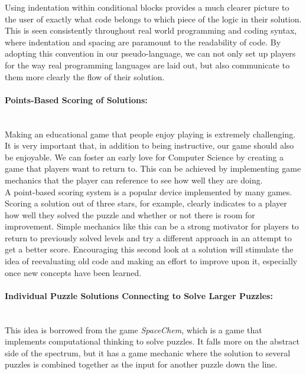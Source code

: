 Using indentation within conditional blocks provides a much clearer picture to the user of exactly what code belongs
to which piece of the logic in their solution. This is seen consistently throughout real world programming and coding
syntax, where indentation and spacing are paramount to the readability of code. By adopting this convention
in our pseudo-language, we can not only set up players for the way real programming languages are laid out, but
also communicate to them more clearly the flow of their solution.\\

\paragraph{Points-Based Scoring of Solutions:}\mbox{} \\
Making an educational game that people enjoy playing is extremely challenging. It is very important that, in addition
to being instructive, our game should also be enjoyable. We can foster an early love for Computer Science by
creating a game that players want to return to. This can be achieved by implementing game mechanics that the
player can reference to see how well they are doing.\\

A point-based scoring system is a popular device implemented by many games. Scoring a solution out of three stars,
for example, clearly indicates to a player how well they solved the puzzle and whether or not there is room for
improvement. Simple mechanics like this can be a strong motivator for players to return to previously solved levels
and try a different approach in an attempt to get a better score. Encouraging this second look at a solution will
stimulate the idea of reevaluating old code and making an effort to improve upon it, especially once new concepts
have been learned.\\

\paragraph{Individual Puzzle Solutions Connecting to Solve Larger Puzzles:}\mbox{} \\
This idea is borrowed from the game \textit{SpaceChem}, which is a game that implements computational thinking
to solve puzzles. It falls more on the abstract side of the spectrum, but it has a game mechanic where the solution to
several puzzles is combined together as the input for another puzzle down the line.\\


